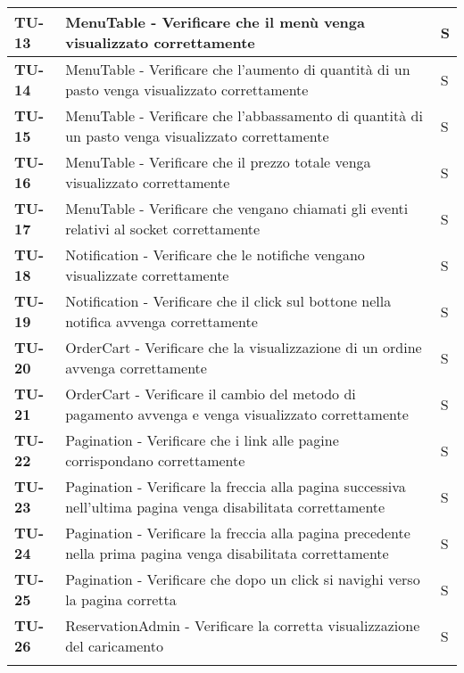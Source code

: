 \begin{longtable}{|>{\centering\arraybackslash}p{1.5cm}|p{15cm}|p{1cm}|}
  \hline
  \rowcolor{gray!10}
  \textbf{TU-13} & MenuTable - Verificare che il menù venga visualizzato correttamente  & S \\
  \hline
  \rowcolor{gray!10}
  \textbf{TU-14} & MenuTable - Verificare che l'aumento di quantità di un pasto venga visualizzato correttamente  & S \\
  \hline
  \rowcolor{gray!10}
  \textbf{TU-15} & MenuTable - Verificare che l'abbassamento di quantità di un pasto venga visualizzato correttamente  & S \\
  \hline
  \rowcolor{gray!10}
  \textbf{TU-16} & MenuTable - Verificare che il prezzo totale venga visualizzato correttamente  & S \\
  \hline
  \rowcolor{gray!10}
  \textbf{TU-17} & MenuTable - Verificare che vengano chiamati gli eventi relativi al socket correttamente  & S \\
  \hline
  \rowcolor{gray!10}
  \textbf{TU-18} & Notification - Verificare che le notifiche vengano visualizzate correttamente  & S \\
  \hline
  \rowcolor{gray!10}
  \textbf{TU-19} & Notification - Verificare che il click sul bottone nella notifica avvenga correttamente  & S \\
  \hline
  \rowcolor{gray!10}
  \textbf{TU-20} & OrderCart - Verificare che la visualizzazione di un ordine avvenga correttamente  & S \\
  \hline
  \rowcolor{gray!10}
  \textbf{TU-21} & OrderCart - Verificare il cambio del metodo di pagamento avvenga e venga visualizzato correttamente  & S \\
  \hline
  \rowcolor{gray!10}
  \textbf{TU-22} & Pagination - Verificare che i link alle pagine corrispondano correttamente  & S \\
  \hline
  \rowcolor{gray!10}
  \textbf{TU-23} & Pagination - Verificare la freccia alla pagina successiva nell'ultima pagina venga disabilitata correttamente  & S \\
  \hline
  \rowcolor{gray!10}
  \textbf{TU-24} & Pagination - Verificare la freccia alla pagina precedente nella prima pagina venga disabilitata correttamente  & S \\
  \hline
  \rowcolor{gray!10}
  \textbf{TU-25} & Pagination - Verificare che dopo un click si navighi verso la pagina corretta  & S \\
  \hline
  \rowcolor{gray!10}
  \textbf{TU-26} & ReservationAdmin - Verificare la corretta visualizzazione del caricamento  & S \\
  \hline
  \rowcolor{gray!10}

\end{longtable}
